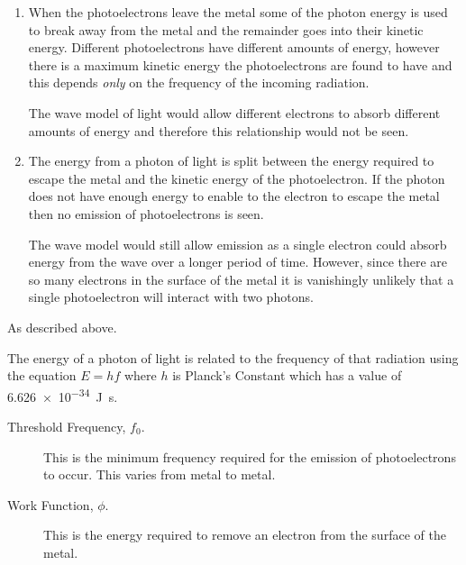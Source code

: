 \documentclass[revision-guide.tex]{subfiles}
\begin{document}
\begin{enumerate}[label=\emph{(\alph*)}]
\item When the photoelectrons leave the metal some of the photon energy is used to break away from the metal and the remainder goes into their kinetic energy. Different photoelectrons have different amounts of energy, however there is a maximum kinetic energy the photoelectrons are found to have and this depends \emph{only} on the frequency of the incoming radiation.

The wave model of light would allow different electrons to absorb different amounts of energy and therefore this relationship would not be seen.

\item The energy from a photon of light is split between the energy required to escape the metal and the kinetic energy of the photoelectron. If the photon does not have enough energy to enable to the electron to escape the metal then no emission of photoelectrons is seen.

The wave model would still allow emission as a single electron could absorb energy from the wave over a longer period of time. However, since there are so many electrons in the surface of the metal it is vanishingly unlikely that a single photoelectron will interact with two photons.

\end{enumerate}


As described above.


The energy of a photon of light is related to the frequency of that radiation using the equation $E=hf$ where $h$ is Planck's Constant which has a value of \SI{6.626e-34}{\joule\second}.


\begin{description}
  \item[Threshold Frequency, $f_0$.] This is the minimum frequency required for the emission of photoelectrons to occur. This varies from metal to metal.
  \item[Work Function, $\phi$.] This is the energy required to remove an electron from the surface of the metal.
\end{description}
\end{document}
